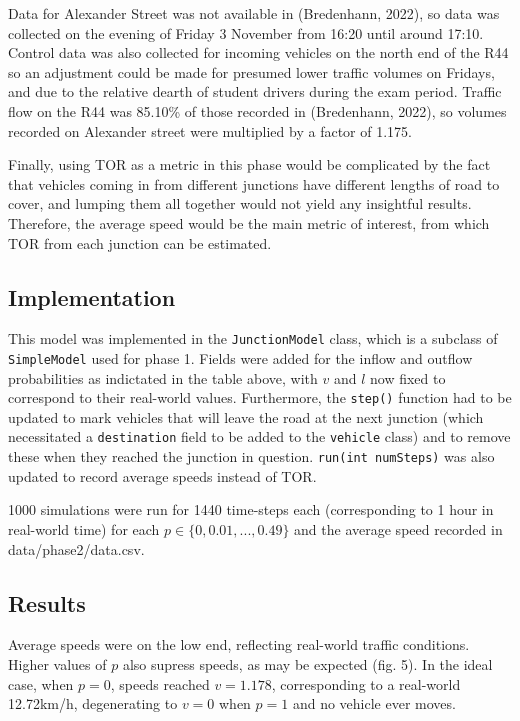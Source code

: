 \documentclass{article}
\begin{document}
Data for Alexander Street was not available in (Bredenhann, 2022), so data was collected on the evening of Friday 3 November from 16:20 until around 17:10. Control data was also collected for incoming vehicles on the north end of the R44 so an adjustment could be made for presumed lower traffic volumes on Fridays, and due to the relative dearth of student drivers during the exam period. Traffic flow on the R44 was 85.10\% of those recorded in (Bredenhann, 2022), so volumes recorded on Alexander street were multiplied by a factor of 1.175.

Finally, using TOR as a metric in this phase would be complicated by the fact that vehicles coming in from different junctions have different lengths of road to cover, and lumping them all together would not yield any insightful results. Therefore, the average speed would be the main metric of interest, from which TOR from each junction can be estimated.

\subsection*{Implementation}

This model was implemented in the \texttt{JunctionModel} class, which is a subclass of \texttt{SimpleModel} used for phase 1. Fields were added for the inflow and outflow probabilities as indictated in the table above, with $v$ and $l$ now fixed to correspond to their real-world values. Furthermore, the \texttt{step()} function had to be updated to mark vehicles that will leave the road at the next junction (which necessitated a \texttt{destination} field to be added to the \texttt{vehicle} class) and to remove these when they reached the junction in question. \texttt{run(int numSteps)} was also updated to record average speeds instead of TOR.

1000 simulations were run for 1440 time-steps each (corresponding to 1 hour in real-world time) for each $p \in \{0, 0.01, ... , 0.49\}$ and the average speed recorded in data/phase2/data.csv.

\subsection*{Results}

Average speeds were on the low end, reflecting real-world traffic conditions. Higher values of $p$ also supress speeds, as may be expected (fig. 5). In the ideal case, when $p=0$, speeds reached $v=1.178$, corresponding to a real-world 12.72km/h, degenerating to $v=0$ when $p=1$ and no vehicle ever moves.
\end{document}
